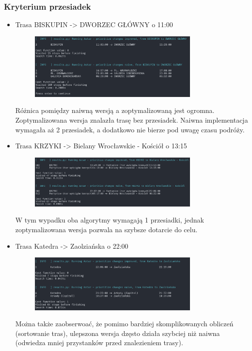 \documentclass[a4paper, 12pt]{article}
\begin{document}
\subsubsection{Kryterium przesiadek}


\begin{itemize}
  \item Trasa BISKUPIN -> DWORZEC GŁÓWNY o 11:00
  \begin{figure}[H]
    \centering
    \includegraphics[width=0.8\textwidth]{2024-04-07-13-00-26.png} 
  \end{figure}
  Różnica pomiędzy naiwną wersją a zoptymalizowaną jest ogromna.
  Zoptymalizowana wersja znalazła trasę bez przesiadek.
  Naiwna implementacja wymagała aż 2 przesiadek,
  a dodatkowo nie bierze pod uwagę czasu podróży.

  \item Trasa KRZYKI -> Bielany Wrocławskie - Kościół o 13:15
  \begin{figure}[H]
    \centering
    \includegraphics[width=0.8\textwidth]{2024-04-07-13-02-12.png} 
  \end{figure}
  W tym wypadku oba algorytmy wymagają 1 przesiadki, jednak zoptymalizowana wersja
  pozwala na szybsze dotarcie do celu.

  \item Trasa Katedra -> Zaolziańska o 22:00
  \begin{figure}[H]
    \centering
    \includegraphics[width=0.8\textwidth]{2024-04-08-06-11-42.png} 
  \end{figure}
  Można także zaobserwoać, że pomimo bardziej skomplikowanych obliczeń (sortowanie tras),
  ulepszona wersja dzęsto działa szybciej niż naiwna (odwiedza mniej przystanków przed znalezieniem trasy).

\end{itemize}
\end{document}
